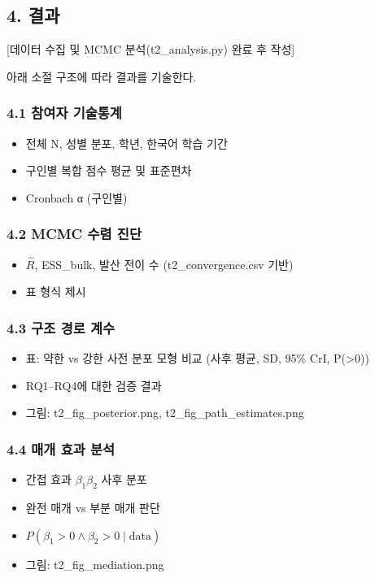 \documentclass[a4paper,10pt]{oblivoir}
\begin{document}
\subsection{4. 결과}

[데이터 수집 및 MCMC 분석(t2\_analysis.py) 완료 후 작성]

아래 소절 구조에 따라 결과를 기술한다.

\subsubsection{4.1 참여자 기술통계}

\begin{itemize}
  \item 전체 N, 성별 분포, 학년, 한국어 학습 기간
  \item 구인별 복합 점수 평균 및 표준편차
  \item Cronbach α (구인별)
\end{itemize}

\subsubsection{4.2 MCMC 수렴 진단}

\begin{itemize}
  \item $\hat{R}$, ESS\_bulk, 발산 전이 수 (t2\_convergence.csv 기반)
  \item 표 형식 제시
\end{itemize}

\subsubsection{4.3 구조 경로 계수}

\begin{itemize}
  \item 표: 약한 vs 강한 사전 분포 모형 비교 (사후 평균, SD, 95\% CrI, P(>0))
  \item RQ1–RQ4에 대한 검증 결과
  \item 그림: t2\_fig\_posterior.png, t2\_fig\_path\_estimates.png
\end{itemize}

\subsubsection{4.4 매개 효과 분석}

\begin{itemize}
  \item 간접 효과 $\beta_1\beta_2$ 사후 분포
  \item 완전 매개 vs 부분 매개 판단
  \item $P(\beta_1>0 \wedge \beta_2>0 \mid \text{data})$
  \item 그림: t2\_fig\_mediation.png
\end{itemize}
\end{document}
